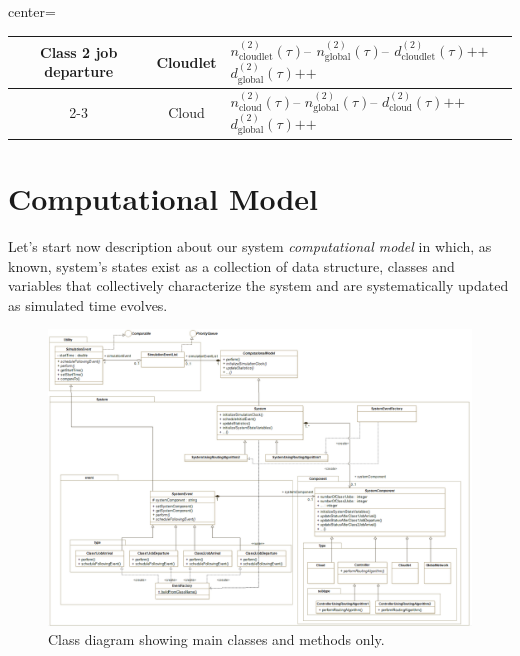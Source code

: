 \documentclass[10pt,a4paper]{article}
\begin{document}
\begin{table}[h!]
\begin{adjustbox}{center=\textwidth}
\begin{tabular}{c|c|p{2.5cm}}
      \multirow{8}{*}{Class 2 job departure} & \multirow{4}{*}{Cloudlet} & $n_{\text{cloudlet}}^{(2)}(\tau)\texttt{--}$ \newline $n_{\text{global}}^{(2)}(\tau)\texttt{--}$ \newline $d_{\text{cloudlet}}^{(2)}(\tau)\texttt{++}$ \newline $d_{\text{global}}^{(2)}(\tau)\texttt{++}$ \\ \cline{2-3} 
      & \multirow{4}{*}{Cloud} & $n_{\text{cloud}}^{(2)}(\tau)\texttt{--}$ \newline $n_{\text{global}}^{(2)}(\tau)\texttt{--}$ \newline $d_{\text{cloud}}^{(2)}(\tau)\texttt{++}$ \newline $d_{\text{global}}^{(2)}(\tau)\texttt{++}$ \\
 
      \bottomrule


    \end{tabular}
    \end{adjustbox}
\end{table}





\newpage
\section{Computational Model}

Let's start now description about our system \textit{computational model} in which, as known, system's states exist as a collection of data structure, classes and variables that collectively characterize the system and are systematically updated as simulated time evolves.

\begin{figure}[H]
\includegraphics[width=\textwidth]{ClassDiagram}
\centering
\caption{Class diagram showing main classes and methods only.}

\label{fig:EventClassDiagram}

\end{figure}
\end{document}
